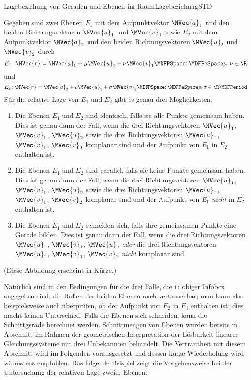 \begin{MXContent}{Lagebeziehung von Geraden und Ebenen im Raum}{Lagebeziehung}{STD}
\begin{MInfo}
Gegeben sind zwei Ebenen $E_1$ mit dem Aufpunktvektor $\MVec{a}_1$ und den beiden Richtungsvektoren $\MVec{u}_1$ und $\MVec{v}_1$ sowie $E_2$ mit dem Aufpunktvektor $\MVec{a}_2$ und den beiden Richtungsvektoren $\MVec{u}_2$ und $\MVec{v}_2$ durch
\[
 E_1\colon \MVec{r}=\MVec{a}_1+\mu\MVec{u}_1+\nu\MVec{v}_1\MDFPSpace;\MDFPaSpace\mu,\nu\in\R
\]
und
\[
 E_2\colon \MVec{r}=\MVec{a}_2+\rho\MVec{u}_2+\sigma\MVec{v}_2\MDFPSpace;\MDFPaSpace\rho,\sigma\in\R\MDFPeriod
\]
Für die relative Lage von $E_1$ und $E_2$ gibt es genau drei Möglichkeiten:
\begin{enumerate}
 \item Die Ebenen $E_1$ und $E_2$ sind identisch, falls sie alle Punkte gemeinsam haben. Dies ist genau dann der Fall, wenn die drei Richtungsvektoren $\MVec{u}_1$, $\MVec{v}_1$, $\MVec{u}_2$ sowie die drei Richtungsvektoren $\MVec{u}_1$, $\MVec{v}_1$, $\MVec{v}_2$ komplanar sind und der Aufpunkt von $E_1$ in $E_2$ enthalten ist.  
 \item Die Ebenen $E_1$ und $E_2$ sind parallel, falls sie keine Punkte gemeinsam haben. Dies ist genau dann der Fall, wenn die drei Richtungsvektoren $\MVec{u}_1$, $\MVec{v}_1$, $\MVec{u}_2$ sowie die drei Richtungsvektoren $\MVec{u}_1$, $\MVec{v}_1$, $\MVec{v}_2$ komplanar sind und der Aufpunkt von $E_1$ \textit{nicht} in $E_2$ enthalten ist. 
 \item Die Ebenen $E_1$ und $E_2$ schneiden sich, falls ihre gemeinsamen Punkte eine Gerade bilden. Dies ist genau dann der Fall, wenn die drei Richtungsvektoren $\MVec{u}_1$, $\MVec{v}_1$, $\MVec{u}_2$ \textit{oder} die drei Richtungsvektoren $\MVec{u}_1$, $\MVec{v}_1$, $\MVec{v}_2$ \textit{nicht} komplanar sind. 
\end{enumerate}

(Diese Abbildung erscheint in Kürze.)

\end{MInfo}

Natürlich sind in den Bedingungen für die drei Fälle, die in obiger Infobox angegeben sind, die Rollen der beiden Ebenen auch vertauschbar; man kann also beispielsweise auch überprüfen, ob der Aufpunkt von $E_2$ in $E_1$ enthalten ist; dies macht keinen Unterschied. Falls die Ebenen sich schneiden, kann die Schnittgerade berechnet werden. Schnittmengen von Ebenen wurden bereits in Abschnitt  im Rahmen der geometrischen Interpretation der Lösbarkeit linearer Gleichungssysteme mit drei Unbekannten behandelt. Die Vertrautheit mit diesem Abschnitt wird im Folgenden vorausgesetzt und dessen kurze Wiederholung wird wärmstens empfohlen. Das folgende Beispiel zeigt die Vorgehensweise bei der Untersuchung der relativen Lage zweier Ebenen.


\end{MXContent}
